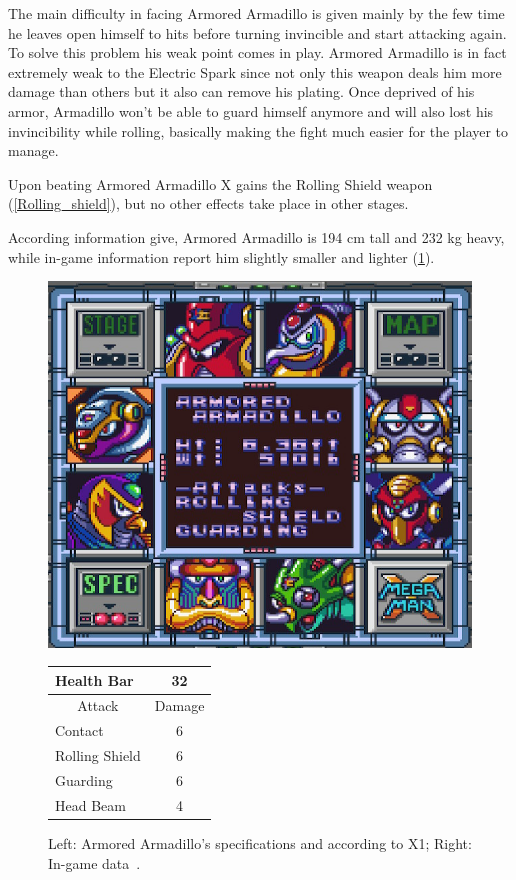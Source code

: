 The main difficulty in facing Armored Armadillo is given mainly by the few time he leaves open himself to hits before turning invincible and start attacking again. To solve this problem his weak point comes in play. Armored Armadillo is in fact extremely weak to the Electric Spark since not only this weapon deals him more damage than others but it also can remove his plating. Once deprived of his armor, Armadillo won't be able to guard himself anymore and will also lost his invincibility while rolling, basically making the fight much easier for the player to manage.

Upon beating Armored Armadillo X gains the Rolling Shield weapon (\ref{Rolling_shield}), but no other effects take place in other stages.

According information give, Armored Armadillo is 194 cm tall and 232 kg heavy, while in-game information report him slightly smaller and lighter (\ref{Armadillo_specs}).
\begin{figure}[htp]
	\begin{minipage}[c]{0.45\linewidth}
		\vspace{0pt}
		\centering
		\includegraphics[width=\linewidth]{figures/X1/Armored_armadillo/Armored_armadillo_specs.png}
	\end{minipage}
	\begin{minipage}[c]{0.45\linewidth}
		\centering
		\vspace{0pt}
		\begin{tabular}[h]{l c}
			\toprule
			Health Bar & 32\\
			\midrule
			\multicolumn{1}{c}{Attack} & \multicolumn{1}{c}{Damage}\\
			Contact & 6\\
			Rolling Shield& 6\\
			Guarding & 6\\
			Head Beam & 4\\
			\bottomrule
		\end{tabular}
	\end{minipage}
	\caption{Left: Armored Armadillo's specifications and according to X1; Right: In-game data~\cite{wiki:Armored_Armadillo}. }
	\label{Armadillo_specs}
\end{figure}


